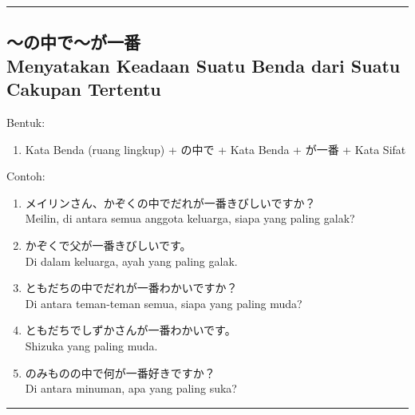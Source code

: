 \vspace{0.2cm}\hrule height 1pt\vspace{0.2cm}


\subsection*{
    ～の中で～が一番 \\
    Menyatakan Keadaan Suatu Benda dari Suatu Cakupan Tertentu
}
Bentuk:
\begin{enumerate}
    \item Kata Benda (ruang lingkup) + の中で + Kata Benda 
    + が一番 + Kata Sifat
\end{enumerate}
Contoh: 
\begin{enumerate}
    \item  メイリンさん、かぞくの中でだれが一番きびしいですか？
    \\ Meilin, di antara semua anggota keluarga, siapa yang paling galak?
    \item かぞくで父が一番きびしいです。
    \\ Di dalam keluarga, ayah yang paling galak.
    \item ともだちの中でだれが一番わかいですか？
    \\ Di antara teman-teman semua, siapa yang paling muda?
    \item ともだちでしずかさんが一番わかいです。
    \\ Shizuka yang paling muda.
    \item のみものの中で何が一番好きですか？
    \\ Di antara minuman, apa yang paling suka?
\end{enumerate}

\vspace{0.2cm}\hrule height 1pt\vspace{0.2cm}

